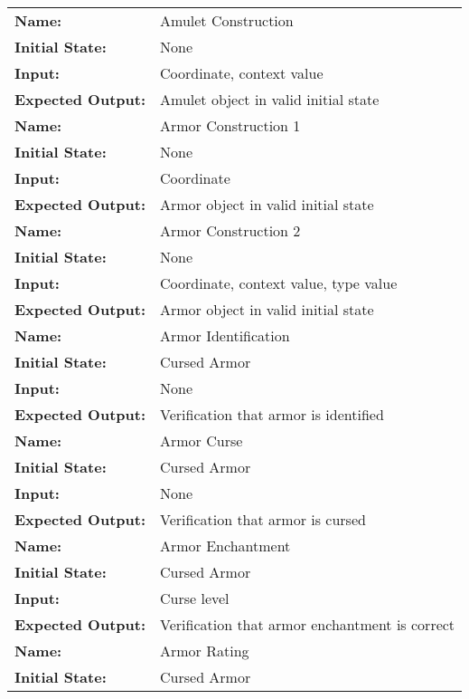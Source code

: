 \documentclass[12pt, titlepage]{article}
\begin{document}
		\begin{center}

			\begin{longtable}{ l | p{10cm} }
				\hline
				\rule{0pt}{2em}\textbf{Name:} & Amulet Construction\\
				\textbf{Initial State:} & None\\
				\textbf{Input:} & Coordinate, context value\\
				\textbf{Expected Output:} & Amulet object in valid initial state\\[1em]
				\hline
				\rule{0pt}{2em}\textbf{Name:} & Armor Construction 1\\
				\textbf{Initial State:} & None\\
				\textbf{Input:} & Coordinate\\
				\textbf{Expected Output:} & Armor object in valid initial state\\[1em]
				\hline
				\rule{0pt}{2em}\textbf{Name:} & Armor Construction 2\\
				\textbf{Initial State:} & None\\
				\textbf{Input:} & Coordinate, context value, type value\\
				\textbf{Expected Output:} & Armor object in valid initial state\\[1em]
				\hline
				\rule{0pt}{2em}\textbf{Name:} & Armor Identification\\
				\textbf{Initial State:} & Cursed Armor\\
				\textbf{Input:} & None\\
				\textbf{Expected Output:} & Verification that armor is identified\\[1em]
				\hline
				\rule{0pt}{2em}\textbf{Name:} & Armor Curse\\
				\textbf{Initial State:} & Cursed Armor\\
				\textbf{Input:} & None\\
				\textbf{Expected Output:} & Verification that armor is cursed\\[1em]
				\hline
				\rule{0pt}{2em}\textbf{Name:} & Armor Enchantment\\
				\textbf{Initial State:} & Cursed Armor\\
				\textbf{Input:} & Curse level\\
				\textbf{Expected Output:} & Verification that armor enchantment is correct\\[1em]
				\hline
				\rule{0pt}{2em}\textbf{Name:} & Armor Rating\\
				\textbf{Initial State:} & Cursed Armor\\

\end{longtable}
\end{center}
\end{document}
